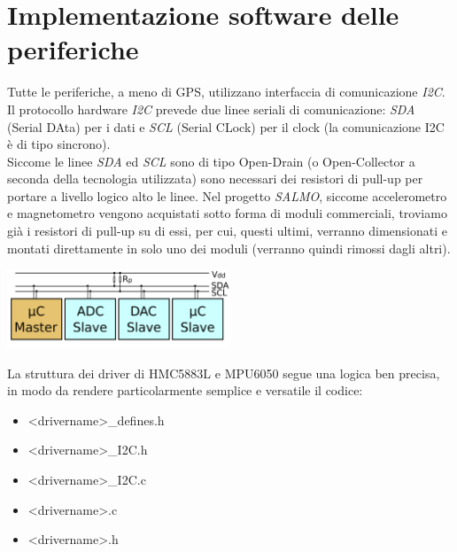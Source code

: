 \hypertarget{implementazione-software-delle-periferiche}{%
\section{Implementazione software delle
periferiche}\label{implementazione-software-delle-periferiche}}

Tutte le periferiche, a meno di GPS, utilizzano interfaccia di
comunicazione \emph{I2C}.\\
Il protocollo hardware \emph{I2C} prevede due linee seriali di
comunicazione: \emph{SDA} (Serial DAta) per i dati e \emph{SCL} (Serial
CLock) per il clock (la comunicazione I2C è di tipo sincrono).\\
Siccome le linee \emph{SDA} ed \emph{SCL} sono di tipo Open-Drain (o
Open-Collector a seconda della tecnologia utilizzata) sono necessari dei
resistori di pull-up per portare a livello logico alto le linee. Nel
progetto \emph{SALMO}, siccome accelerometro e magnetometro vengono
acquistati sotto forma di moduli commerciali, troviamo già i resistori
di pull-up su di essi, per cui, questi ultimi, verranno dimensionati e
montati direttamente in solo uno dei moduli (verranno quindi rimossi
dagli altri).

\begin{center}
\includegraphics[width=0.5\textwidth]{figures/image61.png}
\captionsetup{type=figure}
\end{center}

\noindent La struttura dei driver di HMC5883L e MPU6050 segue una logica ben
precisa, in modo da rendere particolarmente semplice e versatile il
codice:

\begin{itemize}
\item
  
  \textless drivername\textgreater\_defines.h
  
\item
  
  \textless drivername\textgreater\_I2C.h
  
\item
  
  \textless drivername\textgreater\_I2C.c
  
\item
  
  \textless drivername\textgreater.c
  
\item
  
  \textless drivername\textgreater.h
  
\end{itemize}

